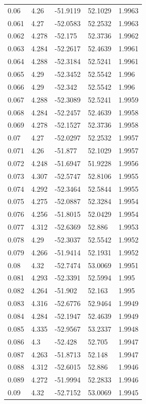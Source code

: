 \begin{tabular}{lllll}
0.06 & 4.26 & -51.9119 & 52.1029 & 1.9963 \\
0.061 & 4.27 & -52.0583 & 52.2532 & 1.9963 \\
0.062 & 4.278 & -52.175 & 52.3736 & 1.9962 \\
0.063 & 4.284 & -52.2617 & 52.4639 & 1.9961 \\
0.064 & 4.288 & -52.3184 & 52.5241 & 1.9961 \\
0.065 & 4.29 & -52.3452 & 52.5542 & 1.996 \\
0.066 & 4.29 & -52.342 & 52.5542 & 1.996 \\
0.067 & 4.288 & -52.3089 & 52.5241 & 1.9959 \\
0.068 & 4.284 & -52.2457 & 52.4639 & 1.9958 \\
0.069 & 4.278 & -52.1527 & 52.3736 & 1.9958 \\
0.07 & 4.27 & -52.0297 & 52.2532 & 1.9957 \\
0.071 & 4.26 & -51.877 & 52.1029 & 1.9957 \\
0.072 & 4.248 & -51.6947 & 51.9228 & 1.9956 \\
0.073 & 4.307 & -52.5747 & 52.8106 & 1.9955 \\
0.074 & 4.292 & -52.3464 & 52.5844 & 1.9955 \\
0.075 & 4.275 & -52.0887 & 52.3284 & 1.9954 \\
0.076 & 4.256 & -51.8015 & 52.0429 & 1.9954 \\
0.077 & 4.312 & -52.6369 & 52.886 & 1.9953 \\
0.078 & 4.29 & -52.3037 & 52.5542 & 1.9952 \\
0.079 & 4.266 & -51.9414 & 52.1931 & 1.9952 \\
0.08 & 4.32 & -52.7474 & 53.0069 & 1.9951 \\
0.081 & 4.293 & -52.3391 & 52.5994 & 1.995 \\
0.082 & 4.264 & -51.902 & 52.163 & 1.995 \\
0.083 & 4.316 & -52.6776 & 52.9464 & 1.9949 \\
0.084 & 4.284 & -52.1947 & 52.4639 & 1.9949 \\
0.085 & 4.335 & -52.9567 & 53.2337 & 1.9948 \\
0.086 & 4.3 & -52.428 & 52.705 & 1.9947 \\
0.087 & 4.263 & -51.8713 & 52.148 & 1.9947 \\
0.088 & 4.312 & -52.6015 & 52.886 & 1.9946 \\
0.089 & 4.272 & -51.9994 & 52.2833 & 1.9946 \\
0.09 & 4.32 & -52.7152 & 53.0069 & 1.9945 \\

\end{tabular}
